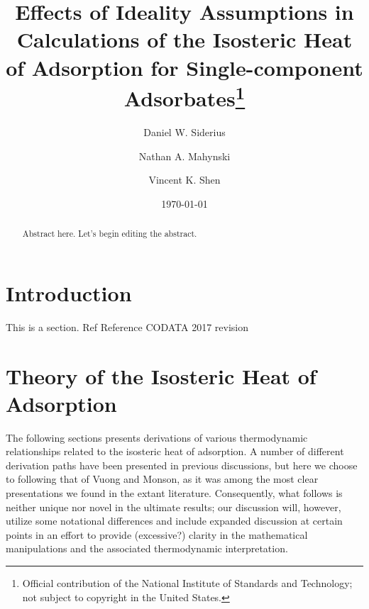 \documentclass[preprint,pre,showkeys,12pt,superscriptaddress,nofootinbib]{revtex4-1}
\begin{document}
\title{Effects of Ideality Assumptions in Calculations of the Isosteric Heat of Adsorption for Single-component Adsorbates\footnote{Official contribution of the National Institute of Standards and Technology; not subject to copyright in the United States.}} 


\author{Daniel W. Siderius}
\author{Nathan A. Mahynski}
\author{Vincent K. Shen}


\date{\today}

\begin{abstract}
Abstract here. Let's begin editing the abstract.
\end{abstract}

\maketitle

\newpage
\section{Introduction}\label{sec:intro}
This is a section. Ref\cite{Botan_Hard-sphere_2009}
Reference CODATA 2017 revision\cite{Newell_CODATA_2017}

\section{Theory of the Isosteric Heat of Adsorption}\label{sec:theory}

The following sections presents derivations of various thermodynamic relationships related to the isosteric heat of adsorption. A number of different derivation paths have been presented in previous discussions\cite{}, but here we choose to following that of  Vuong and Monson\cite{Vuong_Monte_1996}, as it was among the most clear presentations we found in the extant literature. Consequently, what follows is neither unique nor novel in the ultimate results; our discussion will, however, utilize some notational differences and include expanded discussion at certain points in an effort to provide (excessive?) clarity in the mathematical manipulations and the associated thermodynamic interpretation.
\end{document}
